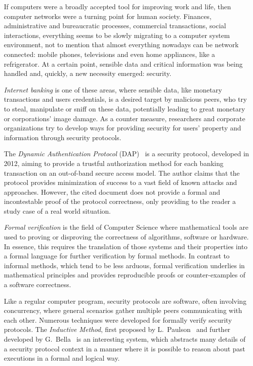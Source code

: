 If computers were a broadly accepted tool for improving work and life, then computer networks were a turning point for human society. Finances, administrative and bureaucratic processes, commercial transactions, social interactions, everything seems to be slowly migrating to a computer system environment, not to mention that almost everything nowadays can be network connected: mobile phones, televisions and even home appliances, like a refrigerator. At a certain point, sensible data and critical information was being handled and, quickly, a new necessity emerged: security.

\textit{Internet banking} is one of these areas, where sensible data, like monetary transactions and users credentials, is a desired target by malicious peers, who try to steal, manipulate or sniff on these data, potentially leading to great monetary or corporations' image damage. As a counter measure, researchers and corporate organizations try to develop ways for providing security for users' property and information through security protocols.

The \textit{Dynamic Authentication Protocol} (DAP)~\cite{Peotta2012} is a security protocol, developed in 2012, aiming to provide a trustful authorization method for each banking transaction on an out-of-band secure access model. The author claims that the protocol provides minimization of success to a vast field of known attacks and approaches. However, the cited document does not provide a formal and incontestable proof of the protocol correctness, only providing to the reader a study case of a real world situation.

\textit{Formal verification} is the field of Computer Science where mathematical tools are used to proving or disproving the correctness of algorithms, software or hardware. In essence, this requires the translation of those systems and their properties into a formal language for further verification by formal methods. In contrast to informal methods, which tend to be less arduous, formal verification underlies in mathematical principles and provides reproducible proofs or counter-examples of a software correctness.

Like a regular computer program, security protocols are software, often involving concurrency, where general scenarios gather multiple peers communicating with each other. Numerous techniques were developed for formally verify security protocols. The \textit{Inductive Method}, first proposed by L.~Paulson~\cite{Paulson98} and further developed by G.~Bella~\cite{Bella2007} is an interesting system, which abstracts many details of a security protocol context in a manner where it is possible to reason about past executions in a formal and logical way.

